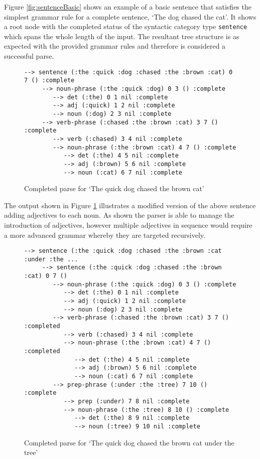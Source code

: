 \documentclass[11pt, a4paper]{article}
\begin{document}
Figure \ref{fig:sentenceBasic} shows an example of a basic sentence that satisfies the simplest grammar rule for a complete sentence, `The dog chased the cat'. It shows a root node with the completed status of the syntactic category type \texttt{sentence} which spans the whole length of the input. The resultant tree structure is as expected with the provided grammar rules and therefore is considered a successful parse.

\begin{figure}[H]
\begin{Verbatim}[frame=leftline]
  --> sentence (:the :quick :dog :chased :the :brown :cat) 0 7 () :complete
     --> noun-phrase (:the :quick :dog) 0 3 () :complete
        --> det (:the) 0 1 nil :complete
        --> adj (:quick) 1 2 nil :complete
        --> noun (:dog) 2 3 nil :complete
     --> verb-phrase (:chased :the :brown :cat) 3 7 () :complete
        --> verb (:chased) 3 4 nil :complete
        --> noun-phrase (:the :brown :cat) 4 7 () :complete
           --> det (:the) 4 5 nil :complete
           --> adj (:brown) 5 6 nil :complete
           --> noun (:cat) 6 7 nil :complete
\end{Verbatim}
\caption{Completed parse for `The quick dog chased the brown cat'}
\label{fig:sentenceInterm}
\end{figure}

The output shown in Figure \ref{fig:sentenceInterm} illustrates a modified version of the above sentence adding adjectives to each noun. As shown the parser is able to manage the introduction of adjectives, however multiple adjectives in sequence would require a more advanced grammar whereby they are targeted recursively.


\begin{figure}[H]
\begin{Verbatim}[frame=leftline]
  --> sentence (:the :quick :dog :chased :the :brown :cat :under :the ...
     --> sentence (:the :quick :dog :chased :the :brown :cat) 0 7 ()
        --> noun-phrase (:the :quick :dog) 0 3 () :complete
           --> det (:the) 0 1 nil :complete
           --> adj (:quick) 1 2 nil :complete
           --> noun (:dog) 2 3 nil :complete
        --> verb-phrase (:chased :the :brown :cat) 3 7 () :completed
           --> verb (:chased) 3 4 nil :complete
           --> noun-phrase (:the :brown :cat) 4 7 () :completed
              --> det (:the) 4 5 nil :complete
              --> adj (:brown) 5 6 nil :complete
              --> noun (:cat) 6 7 nil :complete
        --> prep-phrase (:under :the :tree) 7 10 () :complete
           --> prep (:under) 7 8 nil :complete
           --> noun-phrase (:the :tree) 8 10 () :complete
              --> det (:the) 8 9 nil :complete
              --> noun (:tree) 9 10 nil :complete
\end{Verbatim}
\caption{Completed parse for `The quick dog chased the brown cat under the tree'}
\label{fig:sentenceAdv}
\end{figure}
\end{document}
